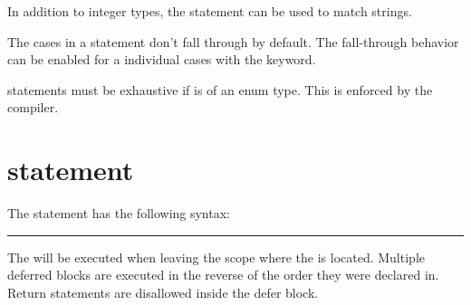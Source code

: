 In addition to integer types, the  statement can be used to match
strings.

The cases in a  statement don't fall through by default. The
fall-through behavior can be enabled for a individual cases with the
 keyword.

 statements must be exhaustive if  is of an
enum type. This is enforced by the compiler.

\section{ statement}

The  statement has the following syntax:

\begin{grammar}
\rule{defer-statement}  
\end{grammar}

The  will be executed when leaving the scope where the
 is located. Multiple deferred blocks are executed
in the reverse of the order they were declared in. Return statements are
disallowed inside the defer block.

